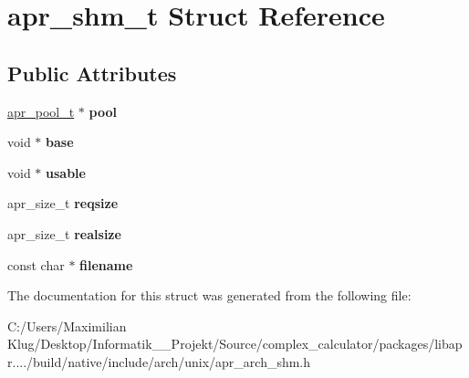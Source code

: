 \hypertarget{structapr__shm__t}{}\section{apr\+\_\+shm\+\_\+t Struct Reference}
\label{structapr__shm__t}
\subsection*{Public Attributes}
\begin{DoxyCompactItemize}
\item 
\mbox{\label{structapr__shm__t_add47a53d3406e48ed35e5d8569c97884}} 
\mbox{\hyperlink{group__apr__pools_gaf137f28edcf9a086cd6bc36c20d7cdfb}{apr\+\_\+pool\+\_\+t}} $\ast$ {\bfseries pool}
\item 
\mbox{\label{structapr__shm__t_a7e429e4238ae397045ecf2301178f5fc}} 
void $\ast$ {\bfseries base}
\item 
\mbox{\label{structapr__shm__t_a62857f13bb696ee6a90078614fcb9b4a}} 
void $\ast$ {\bfseries usable}
\item 
\mbox{\label{structapr__shm__t_aaede2c425028d3c30ca241da05675201}} 
apr\+\_\+size\+\_\+t {\bfseries reqsize}
\item 
\mbox{\label{structapr__shm__t_a58326ee6b7743e11775d73697f301092}} 
apr\+\_\+size\+\_\+t {\bfseries realsize}
\item 
\mbox{\label{structapr__shm__t_a060a607c12af797586396b05a5584f94}} 
const char $\ast$ {\bfseries filename}
\end{DoxyCompactItemize}


The documentation for this struct was generated from the following file\+:\begin{DoxyCompactItemize}
\item 
C\+:/\+Users/\+Maximilian Klug/\+Desktop/\+Informatik\+\_\+\_\+\+Projekt/\+Source/complex\+\_\+calculator/packages/libapr..../build/native/include/arch/unix/apr\+\_\+arch\+\_\+shm.\+h\end{DoxyCompactItemize}
